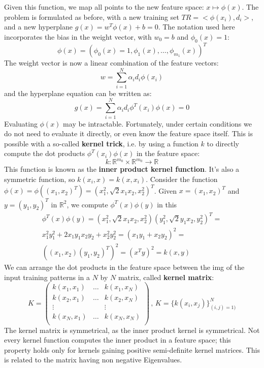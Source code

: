 Given this function, we map all points to the new feature space: $x \mapsto \phi(x)$. The problem is formulated as before, with a new training set $TR = < \phi(x_i),d_i >$, and a new hyperplane $g(x) = w^T \phi(x) + b = 0$. The notation used here incorporates the bias in the weight vector, with $w_0 = b$ and $\phi_0(x) = 1$:
\begin{equation*}
    \phi(x) = (\phi_0(x) = 1, \phi_1(x), \dots , \phi_{m_1}(x))^T
\end{equation*}
The weight vector is now a linear combination of the feature vectors:
\begin{equation*}
    w = \sum_{i=1}^N \alpha_i d_i \phi(x_i)
\end{equation*}
and the hyperplane equation can be written as:
\begin{equation*}
    g(x) = \sum_{i=1}^N \alpha_i d_i \phi^T (x_i) \phi(x) = 0
\end{equation*}
Evaluating $\phi(x)$ may be intractable. Fortunately, under certain conditions we do not need to evaluate it directly, or even know the feature space itself. This is possible with a so-called \textbf{kernel trick}, i.e. by using a function $k$ to directly compute the dot products $\phi^T (x_i) \phi(x)$ in the feature space:
\begin{equation*}
    k : \mathbb{R}^{m_0} \times \mathbb{R}^{m_0} \xrightarrow{} \mathbb{R}
\end{equation*}
This function is known as the \textbf{inner product kernel function}. It's also a symmetric function, so $k(x_i, x) = k(x, x_i)$. Consider the function $\phi(x) = \phi((x_1, x_2)^T) = (x_1^2, \sqrt{2}x_1x_2, x_2^2)^T$. Given $x = (x_1, x_2)^T$ and $y=(y_1,y_2)^T$ in $\mathbb{R}^2$, we compute $\phi^T(x)\phi(y)$ in this 
\begin{gather*}
    \phi^T(x)\phi(y) = (x_1^2, \sqrt{2}x_1x_2, x_2^2) (y_1^2, \sqrt{2}y_1x_2, y_2^2)^T = \\
    x_1^2y_1^2 + 2x_1y_1x_2y_2 + x_2^2y_2^2 = (x_1y_1 + x_2y_2)^2 = \\
    ((x_1,x_2)(y_1,y_2)^T)^2 = (x^Ty)^2 = k(x,y)
\end{gather*}
We can arrange the dot products in the feature space between the img of the input training patterns in a $N$ by $N$ matrix, called \textbf{kernel matrix}:
\begin{equation*}
    K = \begin{pmatrix}
        k(x_1,x_1) & \dots & k(x_1, x_N) \\
        k(x_2,x_1) & \dots & k(x_2, x_N) \\
        \vdots & & \vdots \\
        k(x_N,x_1) & \dots & k(x_N, x_N) \\
        \end{pmatrix} \,, \,
        K = \{k(x_i, x_j)\}_{(i,j)=1)}^N
\end{equation*}
The kernel matrix is symmetrical, as the inner product kernel is symmetrical. Not every kernel function computes the inner product in a feature space; this property holds only for kernels gaining positive semi-definite kernel matrices. This is related to the matrix having non negative Eigenvalues.

